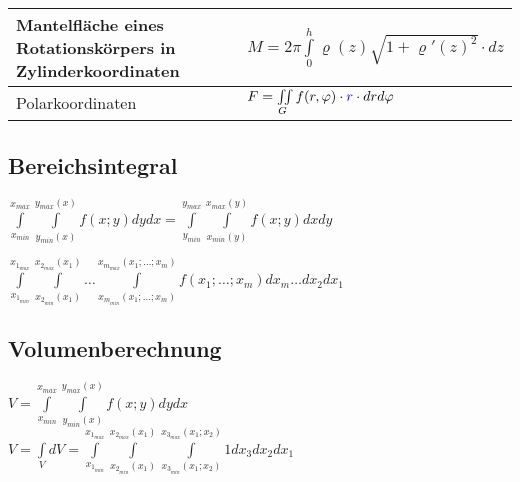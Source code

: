 \begin{tabular}{|p{5.5 cm}|p{10cm}|}
\begin{minipage}{5.5cm}
  		Mantelfläche eines Rotationskörpers in Zylinderkoordinaten    
    \end{minipage}&
	\begin{minipage}{10cm}
    	\vspace{0.1cm}
		$M = 2\pi\int\limits_0^h\varrho(z)\sqrt{1+\varrho'(z)^2}\cdot dz$
    	\vspace{0.1cm}
    \end{minipage}\\
	\hline
	Polarkoordinaten &
	\begin{minipage}{10cm}
    	\vspace{0.1cm}
		$F=\iint\limits_G f(r,\varphi)\cdot \textcolor{blue}{r} \cdot dr d\varphi $
    	\vspace{0.1cm}
    \end{minipage}\\
	\hline
\end{tabular}

\subsection{Bereichsintegral}
\begin{multicols}{2}
  $\boxed{\int\limits_{x_{min}}^{x_{max}}\int\limits_{y_{min}(x)}^{y_{max}(x)}f(x;y) dy dx =
  \int\limits_{y_{min}}^{y_{max}}\int\limits_{x_{min}(y)}^{x_{max}(y)}f(x;y) dx dy }$
  
\columnbreak
  $\boxed{\int\limits_{x_{1_{min}}}^{x_{1_{max}}}\int\limits_{x_{2_{min}}(x_1)}^{x_{2_{max}}(x_1)}\ldots 
  \int\limits_{x_{m_{min}}(x_1;\ldots;x_m)}^{x_{m_{max}}(x_1;\ldots;x_m)}f(x_1;\ldots;x_m)dx_m \ldots dx_2 dx_1}$
  
\end{multicols}


\subsection{Volumenberechnung}
  \begin{multicols}{2}
    $\boxed{V = \int\limits_{x_{min}}^{x_{max}}\int\limits_{y_{min}(x)}^{y_{max}(x)}f(x;y) dy dx}$ \\
    
  \columnbreak
    $\boxed{V = \int\limits_V dV = \int\limits_{x_{1_{min}}}^{x_{1_{max}}}\int\limits_{x_{2_{min}}(x_1)}^{x_{2_{max}}(x_1)}
    \int\limits_{x_{3_{min}}(x_1;x_2)}^{x_{3_{max}}(x_1;x_2)}1 dx_3 dx_2 dx_1}$
  \end{multicols}
\newpage

